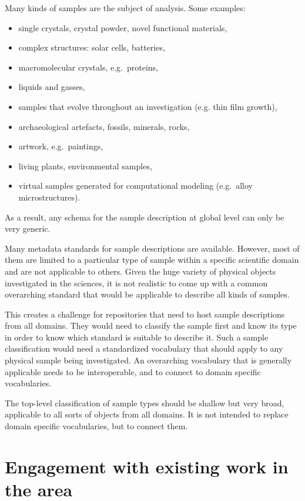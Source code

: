 \documentclass{scrartcl}
\begin{document}
Many kinds of samples are the subject of analysis. Some examples:
\begin{itemize}
\item single crystals, crystal powder, novel functional materials,
\item complex structures: solar cells, batteries,
\item macromolecular crystals, e.g.\ proteins,
\item liquids and gasses,
\item samples that evolve throughout an investigation (e.g. thin film
  growth),
\item archaeological artefacts, fossils, minerals, rocks,
\item artwork, e.g.\ paintings,
\item living plants, environmental samples,
\item virtual samples generated for computational modeling (e.g.\
  alloy microstructures).
\end{itemize}

As a result, any schema for the sample description at global level can
only be very generic.

Many metadata standards for sample descriptions are available.
However, most of them are limited to a particular type of sample
within a specific scientific domain and are not applicable to others.
Given the huge variety of physical objects investigated in the
sciences, it is not realistic to come up with a common overarching
standard that would be applicable to describe all kinds of samples.

This creates a challenge for repositories that need to host sample
descriptions from all domains.  They would need to classify the sample
first and know its type in order to know which standard is suitable to
describe it.  Such a sample classification would need a standardized
vocabulary that should apply to any physical sample being
investigated.  An overarching vocabulary that is generally applicable
needs to be interoperable, and to connect to domain specific
vocabularies.

The top-level classification of sample types should be shallow but
very broad, applicable to all sorts of objects from all domains.  It
is not intended to replace domain specific vocabularies, but to
connect them.

\section{Engagement with existing work in the area}
\end{document}
